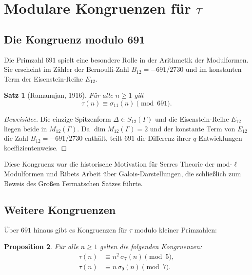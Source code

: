 \documentclass[12pt,a4paper]{amsart}
\newtheorem{theorem}{Satz}[section]
\newtheorem{proposition}[theorem]{Proposition}
\theoremstyle{definition}
\begin{document}
\section{Modulare Kongruenzen für $\tau$}

\subsection{Die Kongruenz modulo 691}

Die Primzahl $691$ spielt eine besondere Rolle in der Arithmetik der Modulformen.
Sie erscheint im Zähler der Bernoulli-Zahl $B_{12} = -691/2730$ und im konstanten
Term der Eisenstein-Reihe $E_{12}$.

\begin{theorem}[Ramanujan, 1916]\label{thm:kong-691}
  Für alle $n \geq 1$ gilt
  \[
    \tau(n) \equiv \sigma_{11}(n) \pmod{691}.
  \]
\end{theorem}

\begin{proof}[Beweisidee]
  Die einzige Spitzenform $\Delta \in S_{12}(\Gamma)$ und die Eisenstein-Reihe
  $E_{12}$ liegen beide in $M_{12}(\Gamma)$. Da $\dim M_{12}(\Gamma) = 2$ und der
  konstante Term von $E_{12}$ die Zahl $B_{12} = -691/2730$ enthält, teilt $691$
  die Differenz ihrer $q$-Entwicklungen koeffizientenweise.
\end{proof}

Diese Kongruenz war die historische Motivation für Serres Theorie der mod-$\ell$
Modulformen und Ribets Arbeit über Galois-Darstellungen, die schließlich zum Beweis
des Großen Fermatschen Satzes führte.

\subsection{Weitere Kongruenzen}

Über $691$ hinaus gibt es Kongruenzen für $\tau$ modulo kleiner Primzahlen:

\begin{proposition}\label{prop:kleine-prim-kong}
  Für alle $n \geq 1$ gelten die folgenden Kongruenzen:
  \begin{align}
    \tau(n) &\equiv n^2\,\sigma_7(n) \pmod{5}, \label{eq:kong5}\\
    \tau(n) &\equiv n\,\sigma_9(n) \pmod{7}. \label{eq:kong7}
  \end{align}
\end{proposition}
\end{document}
